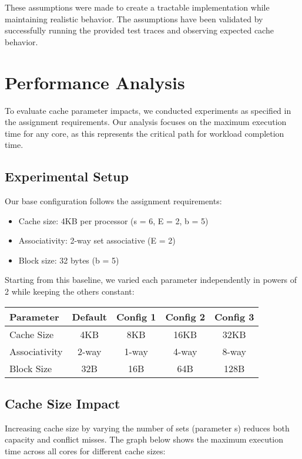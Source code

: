 \documentclass[11pt]{article}
\begin{document}
These assumptions were made to create a tractable implementation while maintaining realistic behavior. The assumptions have been validated by successfully running the provided test traces and observing expected cache behavior.

\section{Performance Analysis}

To evaluate cache parameter impacts, we conducted experiments as specified in the assignment requirements. Our analysis focuses on the maximum execution time for any core, as this represents the critical path for workload completion time.

\subsection{Experimental Setup}

Our base configuration follows the assignment requirements:
\begin{itemize}
    \item Cache size: 4KB per processor (s = 6, E = 2, b = 5)
    \item Associativity: 2-way set associative (E = 2)
    \item Block size: 32 bytes (b = 5)
\end{itemize}

Starting from this baseline, we varied each parameter independently in powers of 2 while keeping the others constant:

\begin{center}
\begin{tabular}{|l|c|c|c|c|}
\hline
\textbf{Parameter} & \textbf{Default} & \textbf{Config 1} & \textbf{Config 2} & \textbf{Config 3} \\
\hline
Cache Size & 4KB & 8KB & 16KB & 32KB \\
Associativity & 2-way & 1-way & 4-way & 8-way \\
Block Size & 32B & 16B & 64B & 128B \\
\hline
\end{tabular}
\end{center}

\subsection{Cache Size Impact}

Increasing cache size by varying the number of sets (parameter s) reduces both capacity and conflict misses. The graph below shows the maximum execution time across all cores for different cache sizes:
\end{document}
